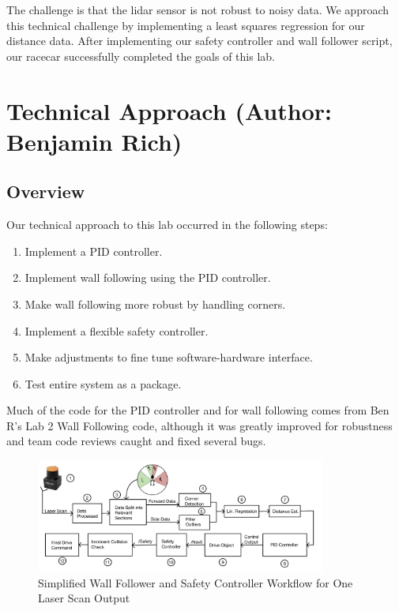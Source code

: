 \documentclass{article}
\begin{document}
The challenge is that the lidar sensor is not robust to noisy data. We approach this technical challenge by implementing a least squares regression for our distance data. After implementing our safety controller and wall follower script, our racecar successfully completed the goals of this lab.\\






\section{Technical Approach (Author: Benjamin Rich)}

\subsection{Overview}
Our technical approach to this lab occurred in the following steps: 
\begin{enumerate}
    \item Implement a PID controller. 
    \item Implement wall following using the PID controller. 
    \item Make wall following more robust by handling corners.
    \item Implement a flexible safety controller.
    \item Make adjustments to fine tune software-hardware interface. 
    \item Test entire system as a package. 
\end{enumerate}
Much of the code for the PID controller and for wall following comes from Ben R's Lab 2 Wall Following code, although it was greatly improved for robustness and team code reviews caught and fixed several bugs. 

\begin{figure}[h]
\begin{center}
\includegraphics[width=0.85\textwidth]{DataFlowImg.png} %
\caption{Simplified Wall Follower and Safety Controller Workflow for One Laser Scan Output}
\end{center}
\label{workflow}
\end{figure}
\end{document}
